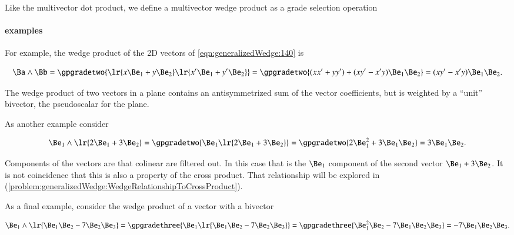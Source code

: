 %
%
Like the multivector dot product, we define a multivector wedge product as a grade selection operation


\paragraph{examples}

For example, the wedge product of the 2D vectors of \cref{eqn:generalizedWedge:140} is

\begin{dmath}\label{eqn:generalizedWedge:500}
\Ba \wedge \Bb
=
\gpgradetwo{
\lr{ x \Be_1 + y \Be_2 }
\lr{ x' \Be_1 + y' \Be_2 }
}
=
\gpgradetwo{
(x x' + y y') + (x y' - x' y) \Be_1 \Be_2
}
=
(x y' - x' y) \Be_1 \Be_2.
\end{dmath}

The wedge product of two vectors in a plane contains an antisymmetrized sum of the vector coefficients, but is weighted by a ``unit'' bivector, the pseudoscalar for the plane.

As another example consider

\begin{dmath}\label{eqn:generalizedWedge:520}
\Be_1 \wedge \lr{ 2\Be_1 + 3 \Be_2 }
=
\gpgradetwo{
\Be_1 \lr{ 2\Be_1 + 3 \Be_2 }
}
=
\gpgradetwo{
2 \Be_1^2 + 3 \Be_1 \Be_2
}
=
3 \Be_1 \Be_2.
\end{dmath}

Components of the vectors are that colinear are filtered out.  In this case that is the \( \Be_1 \) component of the second vector \( \Be_1 + 3 \Be_2 \).  It is not coincidence that this is also a property of the cross product.  That relationship will be explored in (\cref{problem:generalizedWedge:WedgeRelationshipToCrossProduct}).

As a final example, consider the wedge product of a vector with a bivector

\begin{dmath}\label{eqn:generalizedWedge:540}
\Be_1 \wedge \lr{ \Be_1 \Be_2 - 7 \Be_2 \Be_3 }
=
\gpgradethree{
\Be_1 \lr{ \Be_1 \Be_2 - 7 \Be_2 \Be_3 }
}
=
\gpgradethree{
\Be_1^2 \Be_2 - 7 \Be_1 \Be_2 \Be_3
}
=
- 7 \Be_1 \Be_2 \Be_3.
\end{dmath}


